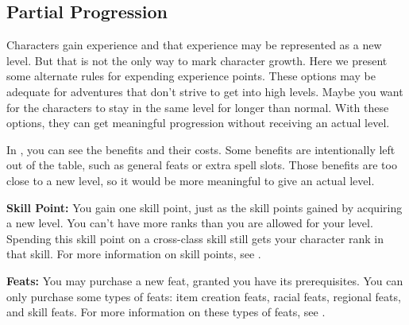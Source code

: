 \subsection{Partial Progression}
Characters gain experience and that experience may be represented as a new level. But that is not the only way to mark character growth. Here we present some alternate rules for expending experience points. These options may be adequate for adventures that don't strive to get into high levels. Maybe you want for the characters to stay in the same level for longer than normal. With these options, they can get meaningful progression without receiving an actual level.

In , you can see the benefits and their costs. Some benefits are intentionally left out of the table, such as general feats or extra spell slots. Those benefits are too close to a new level, so it would be more meaningful to give an actual level.


\textbf{Skill Point:} You gain one skill point, just as the skill points gained by acquiring a new level. You can't have more ranks than you are allowed for your level. Spending this skill point on a cross-class skill still gets your character \onehalf rank in that skill. For more information on skill points, see .

\textbf{Feats:} You may purchase a new feat, granted you have its prerequisites. You can only purchase some types of feats: item creation feats, racial feats, regional feats, and skill feats. For more information on these types of feats, see .
